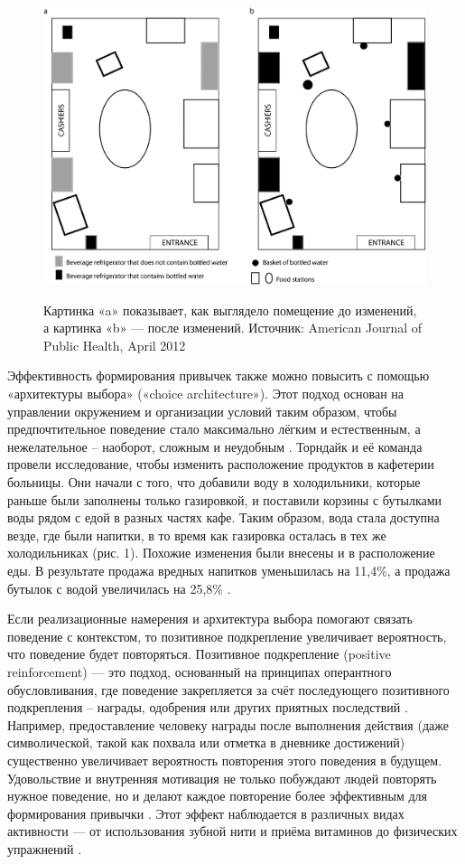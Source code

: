 \documentclass[pdflatex,sn-mathphys-num]{sn-jnl}%
\theoremstyle{thmstyleone}%
\theoremstyle{thmstyletwo}%
\theoremstyle{thmstylethree}%
\begin{document}
\begin{figure}[h]
  \centering
  \includegraphics[width=\linewidth]{figures/thorndaik_architecture_choice.jpeg}
  \label{pic1}
  \caption{Картинка «a» показывает, как выглядело помещение до изменений, а картинка «b» — после изменений. Источник: American Journal of Public Health, April 2012}
\end{figure}

Эффективность формирования привычек также можно повысить с помощью «архитектуры выбора» («choice architecture»). Этот подход основан на управлении окружением и организации условий таким образом, чтобы предпочтительное поведение стало максимально лёгким и естественным, а нежелательное – наоборот, сложным и неудобным \cite{thaler_nudge_2008}. Торндайк и её команда провели исследование, чтобы изменить расположение продуктов в кафетерии больницы. Они начали с того, что добавили воду в холодильники, которые раньше были заполнены только газировкой, и поставили корзины с бутылками воды рядом с едой в разных частях кафе. Таким образом, вода стала доступна везде, где были напитки, в то время как газировка осталась в тех же холодильниках (рис. 1). Похожие изменения были внесены и в расположение еды. В результате продажа вредных напитков уменьшилась на 11,4\%, а продажа бутылок с водой увеличилась на 25,8\% \cite{thorndike_2012}.

Если реализационные намерения и архитектура выбора помогают связать поведение с контекстом, то позитивное подкрепление увеличивает вероятность, что поведение будет повторяться. Позитивное подкрепление (positive reinforcement) — это подход, основанный на принципах оперантного обусловливания, где поведение закрепляется за счёт последующего позитивного подкрепления – награды, одобрения или других приятных последствий \cite{Skinner1953}. Например, предоставление человеку награды после выполнения действия (даже символической, такой как похвала или отметка в дневнике достижений) существенно увеличивает вероятность повторения этого поведения в будущем. Удовольствие и внутренняя мотивация не только побуждают людей повторять нужное поведение, но и делают каждое повторение более эффективным для формирования привычки \cite{Landry2019Positive}. Этот эффект наблюдается в различных видах активности — от использования зубной нити и приёма витаминов до физических упражнений \cite{Judah2018Exploratory, Fremling2025Comparing, Wiedemann2014Intrinsic}.
\end{document}
